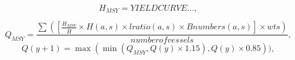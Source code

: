 \documentclass[12pt,oneline,a4paper,numbib]{ouparticle}
\numberwithin{equation}{subsection} %
\begin{document}
\begin{equation}
 H_{MSY} = YIELD CURVE..., 
\end{equation}

\begin{equation}
 Q_{MSY} = \frac
                {\sum( [\frac{H_{MSY}}{\bar{H}} \times H (a, s) \times lratio (a, s) \times B numbers(a, s)] \times wts) }
                {number of vessels}, 
\end{equation}
\begin{equation}
 Q (y+1) = \max( \min(Q_{MSY}, Q(y) \times 1.15), Q(y) \times 0.85)), 
\end{equation}




        
        




\end{document}
